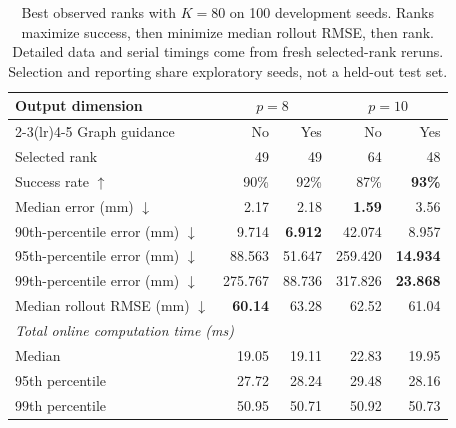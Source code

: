 \begin{table}[htbp]
    \centering
    \small
    \begin{tabular}{lrrrr}
        \toprule
        Output dimension & \multicolumn{2}{c}{$p=8$} & \multicolumn{2}{c}{$p=10$} \\
        \cmidrule(lr){2-3}\cmidrule(lr){4-5}
        Graph guidance & No & Yes & No & Yes \\
        \midrule
        Selected rank & 49 & 49 & 64 & 48 \\
        Success rate $\uparrow$ & 90\% & 92\% & 87\% & \textbf{93\%} \\
        Median error (mm) $\downarrow$ & 2.17 & 2.18 & \textbf{1.59} & 3.56 \\
        90th-percentile error (mm) $\downarrow$ & 9.714 & \textbf{6.912} & 42.074 & 8.957 \\
        95th-percentile error (mm) $\downarrow$ & 88.563 & 51.647 & 259.420 & \textbf{14.934} \\
        99th-percentile error (mm) $\downarrow$ & 275.767 & 88.736 & 317.826 & \textbf{23.868} \\
        Median rollout RMSE (mm) $\downarrow$ & \textbf{60.14} & 63.28 & 62.52 & 61.04 \\
        \midrule
        \multicolumn{5}{l}{\textit{Total online computation time (ms)}} \\
        Median & 19.05 & 19.11 & 22.83 & 19.95 \\
        95th percentile & 27.72 & 28.24 & 29.48 & 28.16 \\
        99th percentile & 50.95 & 50.71 & 50.92 & 50.73 \\
        \bottomrule
    \end{tabular}
    \caption{Best observed ranks with $K=80$ on 100 development seeds. Ranks maximize success, then minimize median rollout RMSE, then rank. Detailed data and serial timings come from fresh selected-rank reruns. Selection and reporting share exploratory seeds, not a held-out test set.}
    \label{tab:best-ranks-k80-compact}
\end{table}
